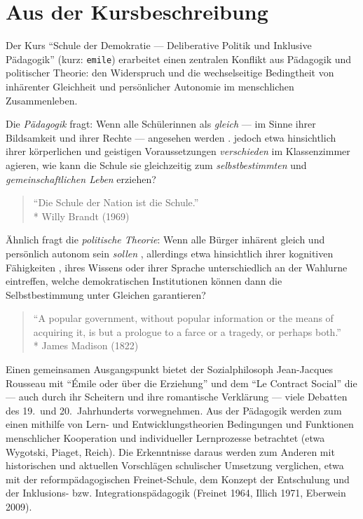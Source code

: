 \section[Kursbeschreibung]{Aus der Kursbeschreibung}

Der Kurs ``Schule der Demokratie --- Deliberative Politik und Inklusive Pädagogik'' (kurz: \lstinline{emile}) erarbeitet einen zentralen Konflikt aus Pädagogik und politischer Theorie:
den Widerspruch und die wechselseitige Bedingtheit von inhärenter Gleichheit und persönlicher Autonomie im menschlichen Zusammenleben.

Die \emph{Pädagogik} fragt:
Wenn alle Schülerinnen als \emph{gleich} --- im Sinne ihrer Bildsamkeit und ihrer Rechte --- angesehen werden \parencites[vgl.][]{UN-2008,benner-2012}.
jedoch etwa hinsichtlich ihrer körperlichen und geistigen Voraussetzungen \emph{verschieden} im Klassenzimmer agieren, wie kann die Schule sie gleichzeitig zum \emph{selbstbestimmten} und \emph{gemeinschaftlichen Leben} erziehen?

\begin{quote}
    ``Die Schule der Nation ist die Schule.''\\*
    Willy Brandt (1969)
\end{quote}

Ähnlich fragt die \emph{politische Theorie}:
Wenn alle Bürger inhärent gleich und persönlich autonom sein \emph{sollen} \parencite[etwa][]{Dahl-1989-aa}, allerdings etwa hinsichtlich ihrer kognitiven Fähigkeiten \parencite{Rosenberg-2002-aa}, ihres Wissens \parencite[etwa][]{Converse-1970-aa} oder ihrer Sprache unterschiedlich an der Wahlurne eintreffen, welche demokratischen Institutionen können dann die Selbstbestimmung unter Gleichen garantieren?

\begin{quote}
    ``A popular government, without popular information or the means of acquiring it, is but a prologue to a farce or a tragedy, or perhaps both.''\\*
    James Madison (1822)
\end{quote}

Einen gemeinsamen Ausgangspunkt bietet der Sozialphilosoph Jean-Jacques Rousseau mit ``Émile oder über die Erziehung'' \parencite{Rousseau1762} und dem ``Le Contract Social'' \parencite{Rousseau-1762-b} die --- auch durch ihr Scheitern und ihre romantische Verklärung --- viele Debatten des 19.\ und 20.\ Jahrhunderts vorwegnehmen.
Aus der Pädagogik werden zum einen mithilfe von Lern- und Entwicklungstheorien Bedingungen und Funktionen menschlicher Kooperation und individueller Lernprozesse betrachtet (etwa Wygotski, Piaget, Reich).
Die Erkenntnisse daraus werden zum Anderen mit historischen und aktuellen Vorschlägen schulischer Umsetzung verglichen, etwa mit der reformpädagogischen Freinet-Schule, dem Konzept der Entschulung und der Inklusions- bzw. Integrationspädagogik (Freinet 1964, Illich 1971, Eberwein 2009).

